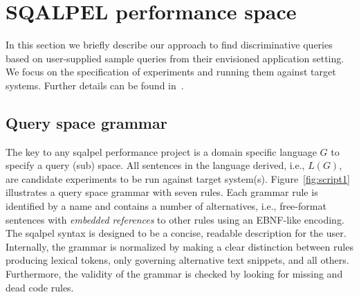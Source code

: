 \documentclass{cidr-2019}
\begin{document}
\section{SQALPEL performance space}\label{overview}

In this section we briefly describe our approach to find
discriminative queries based on user-supplied sample queries from
their envisioned application setting. We focus on the specification
of experiments and running them against target systems. Further
details can be found in~\cite{DBLP:conf/sigmod/KerstenKZ18}.

\subsection{Query space grammar}\label{specification}
The key to any {\sc sqalpel} performance project is a domain specific
language $G$ to specify a query (sub) space. All sentences in the
language derived, i.e., $L(G)$, are candidate experiments to be run
against target system(s). Figure~\ref{fig:script1}
illustrates a query space grammar with seven rules.
Each grammar rule is identified by a name and contains a number of
alternatives, i.e., free-format sentences with \textit{embedded
  references} to other rules using an EBNF-like encoding.
The {\sc sqalpel} syntax is designed to be a concise, readable
description for the user. Internally, the grammar is normalized by
making a clear distinction between rules producing lexical tokens,
only governing alternative text snippets, and all others.
Furthermore, the validity of the grammar is checked by looking for
missing and dead code rules.
\end{document}
